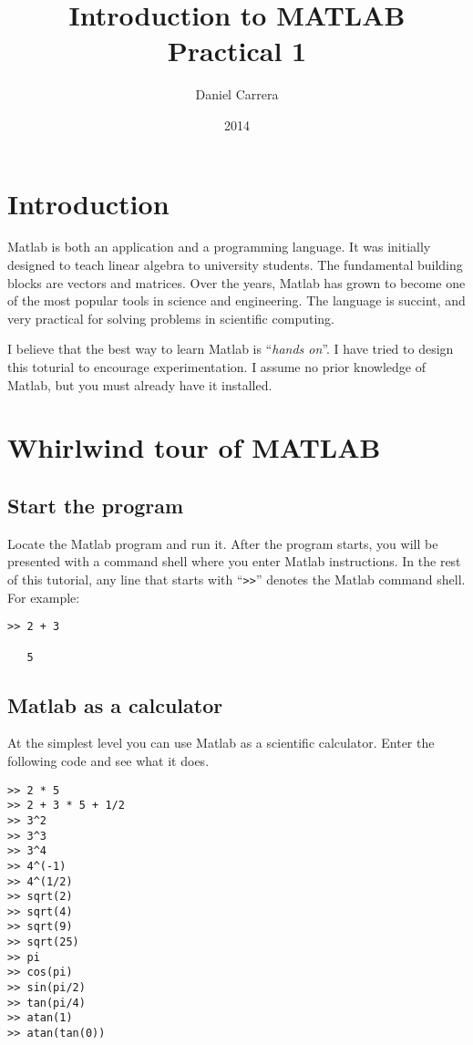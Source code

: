 \documentclass[12pt,a4paper]{article}   %
\author{Daniel Carrera}
\title{Introduction to MATLAB \\ Practical 1}
\date{2014}
\newcommand{\code}[1]{\texttt{#1}}
\begin{document}
\maketitle

\section{Introduction}

Matlab is both an application and a programming language. It was initially designed to
teach linear algebra to university students. The fundamental building blocks are vectors
and matrices. Over the years, Matlab has grown to become one of the most popular tools
in science and engineering. The language is succint, and very practical for solving
problems in scientific computing.

I believe that the best way to learn Matlab is ``\textit{hands on}''. I have tried to
design this toturial to encourage experimentation. I assume no prior knowledge of
Matlab, but you must already have it installed.


\section{Whirlwind tour of MATLAB}

\subsection{Start the program}

Locate the Matlab program and run it. After the program starts, you will be presented with
a command shell where you enter Matlab instructions. In the rest of this tutorial,
any line that starts with ``\code{>>}'' denotes the Matlab command shell. For example:

\begin{verbatim}
>> 2 + 3

   5
\end{verbatim}


\subsection{Matlab as a calculator}

At the simplest level you can use Matlab as a scientific calculator. Enter the following
code and see what it does.

\begin{verbatim}
>> 2 * 5
>> 2 + 3 * 5 + 1/2
>> 3^2
>> 3^3
>> 3^4
>> 4^(-1)
>> 4^(1/2)
>> sqrt(2)
>> sqrt(4)
>> sqrt(9)
>> sqrt(25)
>> pi
>> cos(pi)
>> sin(pi/2)
>> tan(pi/4)
>> atan(1)
>> atan(tan(0))
\end{verbatim}
\end{document}
